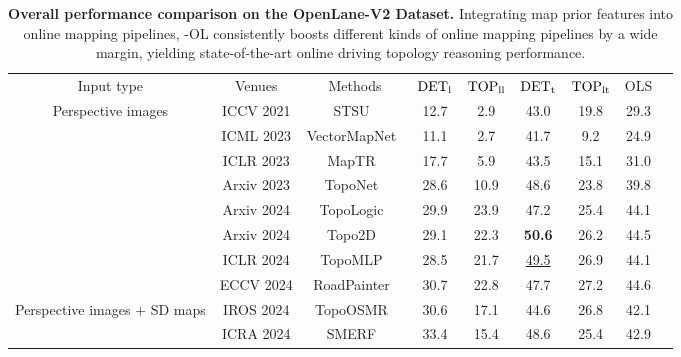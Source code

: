 \begin{table*}[!t]\centering
    \begin{spacing}{0.8}
    \caption{\textbf{Overall performance comparison on the OpenLane-V2 Dataset.} Integrating map prior features into online mapping pipelines, \methodname-OL consistently boosts different kinds of online mapping pipelines by a wide margin, yielding state-of-the-art online driving topology reasoning performance.
    }\label{tab:prior_online_mapping}
    \end{spacing}
    \footnotesize
    \begin{tabular}{ccccccccc}\toprule
        Input type &Venues &Methods &${\rm DET_l}$ &${\rm TOP_{ll}}$ &${\rm DET_t}$ &${\rm TOP_{lt}}$ &\cellcolor{gray!30} OLS \\\cmidrule{1-8}
        \multirow{8}{*}{Perspective images} &ICCV 2021 &STSU~\cite{Can2021STSU} &12.7 &2.9 &43.0 &19.8 &\cellcolor{gray!30}29.3 \\ 
        &ICML 2023 &VectorMapNet~\cite{liu2023vectormapnet} &11.1 &2.7 &41.7 &9.2 &\cellcolor{gray!30}24.9 \\ 
        &ICLR 2023 &MapTR~\cite{MapTR} &17.7 &5.9 &43.5 &15.1 &\cellcolor{gray!30}31.0 \\ 
        &Arxiv 2023 &TopoNet~\cite{li2023toponet} &28.6 &10.9 &48.6 &23.8 &\cellcolor{gray!30}39.8 \\ 
        &Arxiv 2024 &TopoLogic~\cite{fu2024topologic} &29.9 &23.9 &47.2 &25.4 &\cellcolor{gray!30}44.1 \\ 
        &Arxiv 2024 &Topo2D~\cite{li2024topo2d} &29.1 &22.3 &\textbf{50.6} &26.2 &\cellcolor{gray!30}44.5 \\ 
        &ICLR 2024 &TopoMLP~\cite{wu2024topomlp} &28.5 &21.7 &\underline{49.5} &26.9 &\cellcolor{gray!30}44.1 \\ 
        &ECCV 2024 &RoadPainter~\cite{ma2024roadpainter} &30.7 &22.8 &47.7 &27.2 &\cellcolor{gray!30}44.6 \\\cmidrule{1-8}
        \multirow{4}{*}{Perspective images + SD maps}  
        &IROS 2024 &TopoOSMR~\cite{zhang2024enhancingonlineroadnetwork} &30.6 &17.1 &44.6 &26.8 &\cellcolor{gray!30}42.1 \\ &ICRA 2024 &SMERF~\cite{luo2024smerf} &33.4 &15.4 &48.6 &25.4 &\cellcolor{gray!30}42.9 \\

\end{tabular}
\end{table*}
